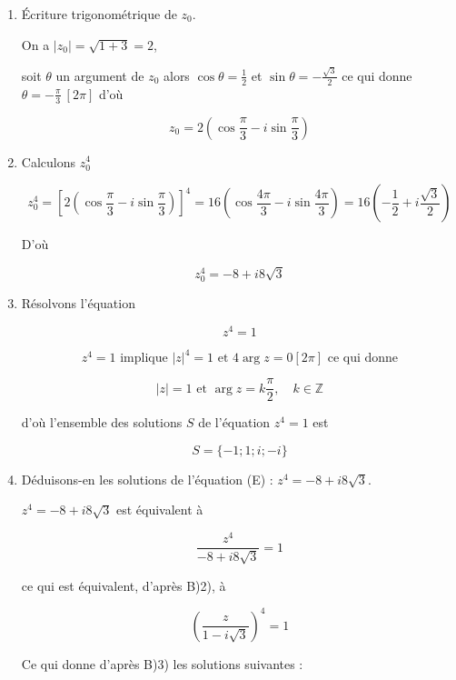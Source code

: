 \documentclass[12pt,a4paper]{article}
\begin{document}
\begin{enumerate}

    \item Écriture trigonométrique de \( z_0 \).

          On a \( |z_0| = \sqrt{1 + 3} = 2 \),

          soit \( \theta \) un argument de \( z_0 \) alors \( \cos\theta = \frac{1}{2} \) et \( \sin\theta = -\frac{\sqrt{3}}{2} \)
          ce qui donne \( \theta = -\frac{\pi}{3} \ [2\pi] \) d’où

          \[
              z_0 = 2 \left( \cos \frac{\pi}{3} - i \sin \frac{\pi}{3} \right)
          \]

    \item Calculons $z_0^4$

          \[
              z_0^4 = [2(\cos \frac{\pi}{3} - i \sin \frac{\pi}{3})]^4 = 16(\cos \frac{4\pi}{3} - i \sin \frac{4\pi}{3}) = 16\left(-\frac{1}{2} + i \frac{\sqrt{3}}{2} \right)
          \]

          D’où

          \[
              z_0^4 = -8 + i 8\sqrt{3}
          \]

    \item Résolvons l’équation

          \[
              z^4 = 1
          \]

          \[
              z^4 = 1 \text{ implique } |z|^4 = 1 \text{ et } 4 \arg z = 0 [2\pi] \text{ ce qui donne}
          \]

          \[
              |z| = 1 \text{ et } \arg z = k \frac{\pi}{2}, \quad k \in \mathbb{Z}
          \]

          d’où l’ensemble des solutions $S$ de l’équation $z^4 = 1$ est

          \[
              S = \{-1; 1; i; -i\}
          \]

    \item Déduisons-en les solutions de l’équation (E) : $z^4 = -8 + i 8\sqrt{3}$.

          $z^4 = -8 + i 8\sqrt{3}$ est équivalent à

          \[
              \frac{z^4}{-8 + i 8\sqrt{3}} = 1
          \]

          ce qui est équivalent, d’après B)2), à

          \[
              \left(\frac{z}{1 - i \sqrt{3}}\right)^4 = 1
          \]

          Ce qui donne d’après B)3) les solutions suivantes :


\end{enumerate}
\end{document}
